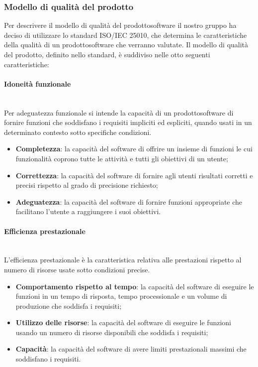 \subsubsection{Modello di qualità del prodotto} 
Per descrivere il modello di qualità del prodotto\glosp software il nostro gruppo ha deciso di utilizzare lo standard ISO/IEC 25010, che determina le caratteristiche della qualità di un prodotto\glosp software che verranno valutate. Il modello di qualità del prodotto\glo, definito nello standard, è suddiviso nelle otto seguenti caratteristiche:
	\paragraph{Idoneità funzionale} \mbox{}\\
	Per adeguatezza funzionale si intende la capacità di un prodotto\glosp software di fornire funzioni che soddisfano i requisiti impliciti ed espliciti, quando usati in un determinato contesto sotto specifiche condizioni.
	\begin{itemize}
		\item \textbf{Completezza}: la capacità del software di offrire un insieme di funzioni le cui funzionalità coprono tutte le attività e tutti gli obiettivi di un utente;
		\item \textbf{Correttezza}: la capacità del software di fornire agli utenti risultati corretti e precisi rispetto al grado di precisione richiesto;
		\item \textbf{Adeguatezza}: la capacità del software di fornire funzioni appropriate che facilitano l'utente a raggiungere i suoi obiettivi.
	\end{itemize}
	\paragraph{Efficienza prestazionale} \mbox{}\\
	L'efficienza prestazionale è la caratteristica relativa alle prestazioni rispetto al numero di risorse usate sotto condizioni precise.
	\begin{itemize}
		\item \textbf{Comportamento rispetto al tempo}: la capacità del software di eseguire le funzioni in un tempo di risposta, tempo processionale e un volume di produzione che soddisfa i requisiti;
		\item \textbf{Utilizzo delle risorse}: la capacità del software di eseguire le funzioni usando un numero di risorse disponibili che soddisfa i requisiti;
		\item \textbf{Capacità}: la capacità del software di avere limiti prestazionali massimi che soddisfano i requisiti.
	\end{itemize}
